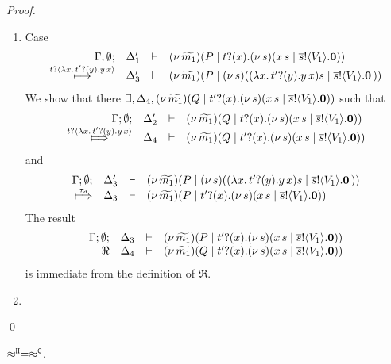 \begin{proof}
\begin{enumerate}
\begin{enumerate}
					\item	Case
						\[
							\begin{array}{rcll} \Gamma; \emptyset; &\Delta_1'& \vdash& (\nu\, \widetilde{m_1})(P \;|\; t ? (x) . (\nu\, s)(x\, {s} \;|\; \overline{s} ! \langle V_1 \rangle . \mathbf{0}))\\ \stackrel{t ? \langle  \lambda x.\,t' ? (y) .{y\, {x}}  \rangle}{\longmapsto} &\Delta_3'& \vdash &  (\nu\, \widetilde{m_1})(P \;|\; (\nu\, s)(  (\lambda x.\,t' ? (y) .{y\, {x}}){s}  \;|\; \overline{s} ! \langle V_1 \rangle . \mathbf{0} \, {)}) \end{array}
						\]
						We show that there $\exists, \Delta_4, (\nu\, \widetilde{m_1})(Q \;|\; t' ? (x) . (\nu\, s)(x\, {s} \;|\; \overline{s} ! \langle V_1 \rangle . \mathbf{0}))$ such that
						\[
							\mhorel{\Gamma}{\Delta_2'}{\newsp{\widetilde{m_1}}{Q \Par \hotrigger{t}{x}{s}{V_1}}}
							{\Hby{\bactinp{t}{ \abs{x}{\binp{t'}{y}{\appl{y}{x}}  }}}}
							{\Delta_4}{}{\newsp{\widetilde{m_1}}{Q \Par \hotrigger{t'}{x}{s}{V_1}}}
						\]
						and
						\[
							\mhorel{\Gamma}{\Delta_3'}{\newsp{\widetilde{m_1}}{P \Par \newsp{s}{  \appl{(\abs{x}{\binp{t'}{y}{\appl{y}{x}})}{s}  \Par \bout{\dual{s}}{V_1} \inact }}}}
							{\Hby{\tau_d}}
							{\Delta_3}{}{\newsp{\widetilde{m_1}}{P \Par \hotrigger{t'}{x}{s}{V_1}}}
						\]
						The result
						\[
							\begin{array}{rcll} \Gamma; \emptyset; &\Delta_3& \vdash& (\nu\, \widetilde{m_1})(P \;|\; t' ? (x) . (\nu\, s)(x\, {s} \;|\; \overline{s} ! \langle V_1 \rangle . \mathbf{0}))\\ \Re &\Delta_4& \vdash &  (\nu\, \widetilde{m_1})(Q \;|\; t' ? (x) . (\nu\, s)(x\, {s} \;|\; \overline{s} ! \langle V_1 \rangle . \mathbf{0})) \end{array}
						\]
						is immediate from the definition of $\Re$.

				\item {}
				\end{enumerate}
	\end{enumerate}
	\qed
\end{proof}



\begin{lemma}
	\label{app:lem:wb_eq_wbf}
	$\approx^\mathtt{H} = \approx^\mathtt{C}$.
\end{lemma}

